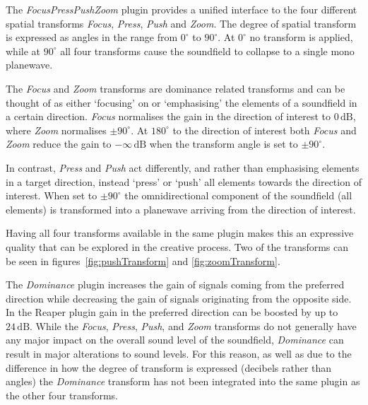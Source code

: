 \documentclass{article}
\begin{document}
The \emph{FocusPressPushZoom} plugin provides a unified interface to the four different spatial transforms \emph{Focus}, \emph{Press}, \emph{Push} and \emph{Zoom}.
The degree of spatial transform is expressed as angles in the range from $0^\circ$ to $90^\circ$. 
At $0^\circ$ no transform is applied, while at $90^\circ$ all four transforms cause the soundfield to collapse to a single mono planewave.

The \emph{Focus} and \emph{Zoom} transforms are dominance related transforms and can be thought of as either `focusing' on or `emphasising' the elements of a soundfield in a certain direction.
\emph{Focus} normalises the gain in the direction of interest to $0\,\mathrm{dB}$, where \emph{Zoom} normalises $\pm90^\circ$.
At $180^\circ$ to the direction of interest both \emph{Focus} and \emph{Zoom} reduce the gain to $-\infty\,\mathrm{dB}$ when the transform angle is set to $\pm90^\circ$.

In contrast, \emph{Press} and \emph{Push} act differently, and rather than emphasising elements in a target direction, instead `press' or `push' all elements towards the direction of interest.
When set to $\pm90^\circ$ the omnidirectional component of the soundfield (all elements) is transformed into a planewave arriving from the direction of interest.



Having all four transforms available in the same plugin makes this an expressive quality that can be explored in the creative process.
Two of the transforms can be seen in figures~\ref{fig:pushTransform} and \ref{fig:zoomTransform}.

The \emph{Dominance} plugin increases the gain of signals coming from the preferred direction while decreasing the gain of signals originating from the opposite side.
In the Reaper plugin gain in the preferred direction can be boosted by up to $24\,\mathrm{dB}$.
While the \emph{Focus}, \emph{Press}, \emph{Push}, and \emph{Zoom} transforms do not generally have any major impact on the overall sound level of the soundfield, \emph{Dominance} can result in major alterations to sound levels.
For this reason, as well as due to the difference in how the degree of transform is expressed (decibels rather than angles) the \emph{Dominance} transform has not been integrated into the same plugin as the other four transforms.
\end{document}
